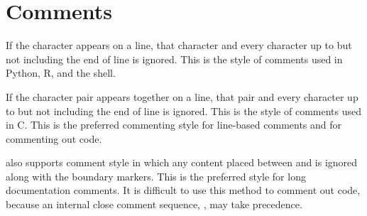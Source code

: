 \section{Comments}

If the character \code{\#} appears on a line, that character and every
character up to but not including the end of line is ignored.  This is
the style of comments used in Python, R, and the shell.  

If the character pair \code{//} appears together on a line, that pair
and every character up to but not including the end of line is
ignored.  This is the style of comments used in C.  This is the
preferred commenting style for line-based comments and for commenting
out code.

\Stan also supports \Cpp comment style in which any content placed
between \code{/*} and \code{*/} is ignored along with the boundary
markers.  This is the preferred style for long documentation comments.
It is difficult to use this method to comment out code, because 
an internal close comment sequence, \code{*/}, may take precedence.





